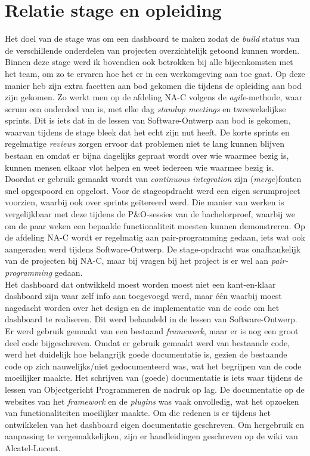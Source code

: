 \documentclass[10pt,a4paper]{article}
\begin{document}
\section{Relatie stage en opleiding}
\label{relatie}
Het doel van de stage was om een dashboard te maken zodat de \textit{build} status van de verschillende onderdelen van projecten overzichtelijk getoond kunnen worden. Binnen deze stage werd ik bovendien ook betrokken bij alle bijeenkomsten met het team, om zo te ervaren hoe het er in een werkomgeving aan toe gaat. Op deze manier heb zijn extra facetten aan bod gekomen die tijdens de opleiding aan bod zijn gekomen. Zo werkt men op de afdeling NA-C volgens de \textit{agile}-methode, waar scrum een onderdeel van is, met elke dag \textit{standup meetings} en tweewekelijkse sprints. Dit is iets dat in de lessen van Software-Ontwerp aan bod is gekomen, waarvan tijdens de stage bleek dat het echt zijn nut heeft. De korte sprints en regelmatige \textit{reviews} zorgen ervoor dat problemen niet te lang kunnen blijven bestaan en omdat er bijna dagelijks gepraat wordt over wie waarmee bezig is, kunnen mensen elkaar vlot helpen en weet iedereen wie waarmee bezig is. Doordat er gebruik gemaakt wordt van \textit{continuous integration} zijn (\textit{merge})fouten snel opgespoord en opgelost. Voor de stageopdracht werd een eigen scrumproject voorzien, waarbij ook over sprints ge\"itereerd werd. Die manier van werken is vergelijkbaar met deze tijdens de P\&O-sessies van de bachelorproef, waarbij we om de paar weken een bepaalde functionaliteit moesten kunnen demonstreren. Op de afdeling NA-C wordt er regelmatig aan pair-programming gedaan, iets wat ook aangeraden werd tijdens Software-Ontwerp. De stage-opdracht was onafhankelijk van de projecten bij NA-C, maar bij vragen bij het project is er wel aan \textit{pair-programming} gedaan.\\
Het dashboard dat ontwikkeld moest worden moest niet een kant-en-klaar dashboard zijn waar zelf info aan toegevoegd werd, maar \'e\'en waarbij moest nagedacht worden over het design en de implementatie van de code om het dashboard te realiseren. Dit werd behandeld in de lessen van Software-Ontwerp.\\
Er werd gebruik gemaakt van een bestaand \textit{framework}, maar er is nog een groot deel code bijgeschreven. Omdat er gebruik gemaakt werd van bestaande code, werd het duidelijk hoe belangrijk goede documentatie is, gezien de bestaande code op zich nauwelijks/niet gedocumenteerd was, wat het begrijpen van de code moeilijker maakte. Het schrijven van (goede) documentatie is iets waar tijdens de lessen van Objectgericht Programmeren de nadruk op lag. De documentatie op de websites van het \textit{framework} en de \textit{plugins}  was vaak onvolledig, wat het opzoeken van functionaliteiten moeilijker maakte. Om die redenen is er tijdens het ontwikkelen van het dashboard eigen documentatie geschreven. Om hergebruik en aanpassing te vergemakkelijken, zijn er handleidingen geschreven op de wiki van Alcatel-Lucent.\\
\end{document}
